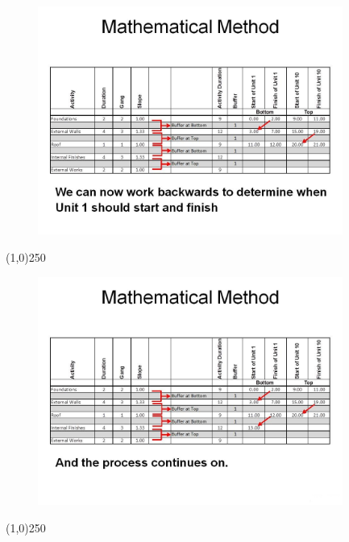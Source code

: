 \begin{frame}
\begin{figure}
	\centering
		\includegraphics[width = 10.0cm]{oldnotes/Slide291.jpg}
\end{figure}
\end{frame}
\begin{center}\line(1,0){250}\end{center}






\begin{frame}
\begin{figure}
	\centering
		\includegraphics[width = 10.0cm]{oldnotes/Slide292.jpg}
\end{figure}
\end{frame}
\begin{center}\line(1,0){250}\end{center}






